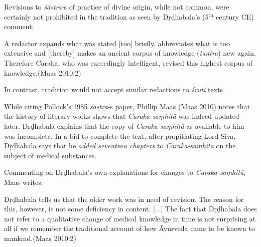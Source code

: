 Revisions to {\sl śāstra}-s of practice of divine origin, while not common, were certainly not prohibited in the tradition as seen by Dṛḍhabala's (5$^{\text{th}}$ century CE) comment:
\begin{myquote}
A redactor expands what was stated [too] briefly, abbreviates what is too extensive and [thereby] makes an ancient corpus of knowledge ({\sl tantra}) new again. Therefore Caraka, who was exceedingly intelligent, revised this highest corpus of knowledge.\hfill (Maas 2010:2)
\end{myquote}

In contrast, tradition would not accept similar redactions to {\sl śruti} texts.

While citing Pollock's 1985 {\sl śāstra}-s paper, Phillip Maas (Maas 2010) notes that the history of literary works shows that {\sl Caraka-saṃhitā} was indeed updated later.  Dṛḍhabala explains that the copy of {\sl Caraka-saṃhitā} as available to him was incomplete.  In a bid to complete the text, after propitiating Lord Siva, Dṛḍhabala says that he {\sl added seventeen chapters} to {\sl Caraka-saṃhitā} on the subject of medical substances.

Commenting on Dṛḍhabala's own explanations for changes to {\sl Caraka-saṃhitā}, Maas writes: 
\begin{myquote}
Dṛḍhabala tells us that the older work was in need of revision. The reason for this, however, is not some deficiency in content. [...] The fact that Dṛḍhabala does not refer to a qualitative change of medical knowledge in time is not surprising at all if we remember the traditional account of how Āyurveda came to be known to mankind.\hfill (Maas 2010:2)
\end{myquote}


